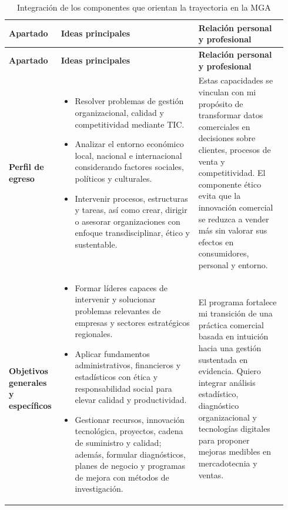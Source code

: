 \documentclass[spanish,letterpaper,oneside]{article}
\begin{document}
\clearpage
\begin{landscape}
\thispagestyle{empty}
\begingroup
\scriptsize
\setlength{\tabcolsep}{4pt}
\renewcommand{\arraystretch}{1.18}
\begin{longtable}{@{}p{0.15\linewidth}p{0.48\linewidth}p{0.31\linewidth}@{}}
\caption{Integración de los componentes que orientan la trayectoria en la MGA}\label{tab:integracion-mga}\\
\toprule
\textbf{Apartado} & \textbf{Ideas principales} & \textbf{Relación personal y profesional} \\
\midrule
\endfirsthead
\toprule
\textbf{Apartado} & \textbf{Ideas principales} & \textbf{Relación personal y profesional} \\
\midrule
\endhead
\textbf{Perfil de egreso} &
\begin{itemize}
 \item Resolver problemas de gestión organizacional, calidad y competitividad mediante TIC.
 \item Analizar el entorno económico local, nacional e internacional considerando factores sociales, políticos y culturales.
 \item Intervenir procesos, estructuras y tareas, así como crear, dirigir o asesorar organizaciones con enfoque transdisciplinar, ético y sustentable.
\end{itemize} &
Estas capacidades se vinculan con mi propósito de transformar datos comerciales en decisiones sobre clientes, procesos de venta y competitividad. El componente ético evita que la innovación comercial se reduzca a vender más sin valorar sus efectos en consumidores, personal y entorno. \\
\midrule
\textbf{Objetivos generales y específicos} &
\begin{itemize}
 \item Formar líderes capaces de intervenir y solucionar problemas relevantes de empresas y sectores estratégicos regionales.
 \item Aplicar fundamentos administrativos, financieros y estadísticos con ética y responsabilidad social para elevar calidad y productividad.
 \item Gestionar recursos, innovación tecnológica, proyectos, cadena de suministro y calidad; además, formular diagnósticos, planes de negocio y programas de mejora con métodos de investigación.
\end{itemize} &
El programa fortalece mi transición de una práctica comercial basada en intuición hacia una gestión sustentada en evidencia. Quiero integrar análisis estadístico, diagnóstico organizacional y tecnologías digitales para proponer mejoras medibles en mercadotecnia y ventas. \\

\end{longtable}
\end{landscape}
\end{document}

